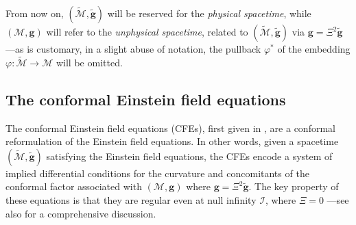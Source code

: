 \documentclass[10pt,a4paper]{article}
\theoremstyle{plain}
\def\bmg{{\bm g}}
\newcounter{mnotecount}%
\newcommand{\mnotex}[1]%
{\protect{\stepcounter{mnotecount}}$^{\mbox{\footnotesize $\bullet$\themnotecount}}$ 
\marginpar{%
\raggedright\tiny\em
$\!\!\!\!\!\!\,\bullet$\themnotecount: #1} }
\begin{document}
From now on, $(\tilde{\mathcal{M}},\tilde{\bmg})$ will be reserved for the \emph{physical spacetime},
while $(\mathcal{M},\bmg)$ will refer to the \emph{unphysical spacetime}, related to
$(\tilde{\mathcal{M}},\tilde{\bmg})$ via $\bmg=\Xi^2\tilde{\bmg}$ ---as is customary, in a slight abuse of notation, the pullback $\varphi^*$ of the
 embedding $\varphi:
\tilde{\mathcal{M}}\rightarrow\mathcal{M}$ will be omitted.



\subsection{The conformal Einstein field equations}
\label{Sec:CFEs}



 

The conformal Einstein field equations (CFEs), first given in \cite{Fri81a}, are a conformal
reformulation of the Einstein field equations. In other words, given a
spacetime $(\tilde{\mathcal{M}},\tilde{\bmg})$ satisfying the Einstein
field equations, the CFEs encode a system of implied differential conditions for the curvature and
concomitants of the conformal factor associated with
$(\mathcal{M},\bmg)$ where $\bmg=\Xi^2\tilde{\bmg}$. The key property
of these equations is that they are regular even at null infinity
$\mathscr{I}$, where $\Xi=0$ ---see also \cite{CFEbook} for a
comprehensive discussion.


\medskip
\end{document}
